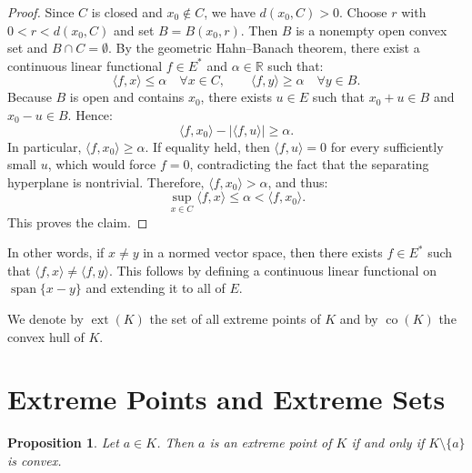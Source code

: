 \documentclass[reqno]{amsart}
\newtheorem{proposition}[theorem]{Proposition}
\theoremstyle{definition}
\newcommand{\abs}[1]{\left\lvert #1 \right\rvert}
\newcommand{\ip}[2]{\langle #1, #2 \rangle}
\newcommand{\ext}{\operatorname{ext}}
\newcommand{\co}{\operatorname{co}}
\newcommand{\R}{\mathbb{R}}
\begin{document}
\begin{proof}
    Since $C$ is closed and $x_0 \notin C$, we have $d(x_0,C) > 0$. Choose $r$ with $0 < r < d(x_0,C)$ and set $B = B(x_0,r)$. Then $B$ is a nonempty open convex set and $B \cap C = \emptyset$. By the geometric Hahn--Banach theorem, there exist a continuous linear functional $f \in E^*$ and $\alpha \in \R$ such that:
    \begin{equation*}
        \ip{f}{x} \le \alpha \quad \forall x \in C, \qquad \ip{f}{y} \ge \alpha \quad \forall y \in B.
    \end{equation*}
    Because $B$ is open and contains $x_0$, there exists $u \in E$ such that $x_0 + u \in B$ and $x_0 - u \in B$. Hence:
    \begin{equation*}
        \ip{f}{x_0} - \abs{\ip{f}{u}} \ge \alpha.
    \end{equation*}
    In particular, $\ip{f}{x_0} \ge \alpha$. If equality held, then $\ip{f}{u} = 0$ for every sufficiently small $u$, which would force $f = 0$, contradicting the fact that the separating hyperplane is nontrivial. Therefore, $\ip{f}{x_0} > \alpha$, and thus:
    \begin{equation*}
        \sup_{x \in C} \ip{f}{x} \le \alpha < \ip{f}{x_0}.
    \end{equation*}
    This proves the claim.
\end{proof}

In other words, if $x \neq y$ in a normed vector space, then there exists $f \in E^*$ such that $\ip{f}{x} \neq \ip{f}{y}$. This follows by defining a continuous linear functional on $\operatorname{span}\{x-y\}$ and extending it to all of $E$.

We denote by $\ext(K)$ the set of all extreme points of $K$ and by $\co(K)$ the convex hull of $K$.

\section{Extreme Points and Extreme Sets}

\begin{proposition}\label{prop:characterization}
Let $a \in K$. Then $a$ is an extreme point of $K$ if and only if $K \setminus \{a\}$ is
convex.
\end{proposition}
\end{document}
